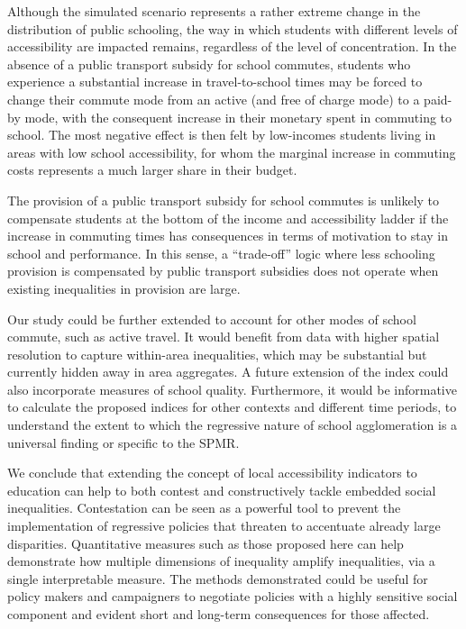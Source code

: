 \documentclass[]{article}
\begin{document}
Although the simulated scenario represents a rather extreme change in
the distribution of public schooling, the way in which students with
different levels of accessibility are impacted remains, regardless of
the level of concentration. In the absence of a public transport subsidy
for school commutes, students who experience a substantial increase in
travel-to-school times may be forced to change their commute mode from
an active (and free of charge mode) to a paid-by mode, with the
consequent increase in their monetary spent in commuting to school. The
most negative effect is then felt by low-incomes students living in
areas with low school accessibility, for whom the marginal increase in
commuting costs represents a much larger share in their budget.

The provision of a public transport subsidy for school commutes is
unlikely to compensate students at the bottom of the income and
accessibility ladder if the increase in commuting times has consequences
in terms of motivation to stay in school and performance. In this sense,
a ``trade-off'' logic where less schooling provision is compensated by
public transport subsidies does not operate when existing inequalities
in provision are large.

Our study could be further extended to account for other modes of school
commute, such as active travel. It would benefit from data with higher
spatial resolution to capture within-area inequalities, which may be
substantial but currently hidden away in area aggregates. A future
extension of the index could also incorporate measures of school
quality. Furthermore, it would be informative to calculate the proposed
indices for other contexts and different time periods, to understand the
extent to which the regressive nature of school agglomeration is a
universal finding or specific to the SPMR.

We conclude that extending the concept of local accessibility indicators
to education can help to both contest and constructively tackle embedded
social inequalities. Contestation can be seen as a powerful tool to
prevent the implementation of regressive policies that threaten to
accentuate already large disparities. Quantitative measures such as
those proposed here can help demonstrate how multiple dimensions of
inequality amplify inequalities, via a single interpretable measure. The
methods demonstrated could be useful for policy makers and campaigners
to negotiate policies with a highly sensitive social component and
evident short and long-term consequences for those affected.
\end{document}
